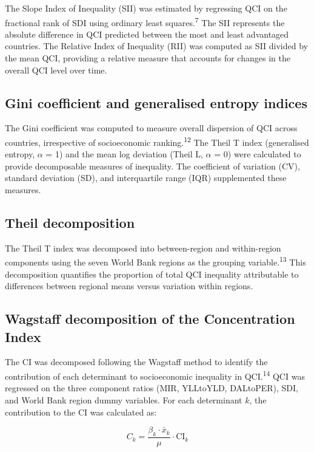 \documentclass[12pt]{article}
\begin{document}
The Slope Index of Inequality (SII) was estimated by regressing QCI on the fractional rank of SDI using ordinary least squares.\textsuperscript{7} The SII represents the absolute difference in QCI predicted between the most and least advantaged countries. The Relative Index of Inequality (RII) was computed as SII divided by the mean QCI, providing a relative measure that accounts for changes in the overall QCI level over time.

\subsection{Gini coefficient and generalised entropy indices}

The Gini coefficient was computed to measure overall dispersion of QCI across countries, irrespective of socioeconomic ranking.\textsuperscript{12} The Theil T index (generalised entropy, $\alpha$ = 1) and the mean log deviation (Theil L, $\alpha$ = 0) were calculated to provide decomposable measures of inequality. The coefficient of variation (CV), standard deviation (SD), and interquartile range (IQR) supplemented these measures.

\subsection{Theil decomposition}

The Theil T index was decomposed into between-region and within-region components using the seven World Bank regions as the grouping variable.\textsuperscript{13} This decomposition quantifies the proportion of total QCI inequality attributable to differences between regional means versus variation within regions.

\subsection{Wagstaff decomposition of the Concentration Index}

The CI was decomposed following the Wagstaff method to identify the contribution of each determinant to socioeconomic inequality in QCI.\textsuperscript{14} QCI was regressed on the three component ratios (MIR, YLLtoYLD, DALtoPER), SDI, and World Bank region dummy variables. For each determinant $k$, the contribution to the CI was calculated as:

\begin{equation}
C_k = \frac{\beta_k \cdot \bar{x}_k}{\mu} \cdot \text{CI}_k
\end{equation}
\end{document}

